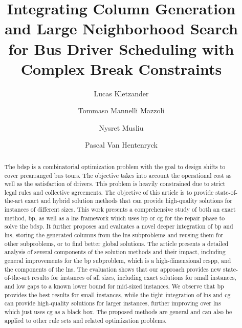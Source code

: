\documentclass[]{amsart}
\theoremstyle{plain}
\begin{document}
\title[Integrating CG and LNS for the BDSP]{Integrating Column Generation and Large Neighborhood Search for Bus Driver Scheduling with Complex Break Constraints}

\author[Kletzander]{Lucas Kletzander}
\author[Mannelli Mazzoli]{Tommaso Mannelli Mazzoli}
\author[Musliu]{Nysret Musliu}
\author[Van Hentenryck]{Pascal Van Hentenryck}

\begin{abstract}
    The \gls{bdsp} is a combinatorial optimization problem with the goal to design shifts to cover prearranged bus tours. The objective takes into account the operational cost as well as the satisfaction of drivers. This problem is heavily constrained due to strict legal rules and collective agreements.
    The objective of this article is to provide state-of-the-art exact and hybrid solution methods that can provide high-quality solutions for instances of different sizes.
    This work presents a comprehensive study of both an exact method, \gls{bp}, as well as a \gls{lns} framework which uses \gls{bp} or \gls{cg} for the repair phase to solve the \gls{bdsp}. It further proposes and evaluates a novel deeper integration of \gls{bp} and \gls{lns}, storing the generated columns from the \gls{lns} subproblems and reusing them for other subproblems, or to find better global solutions. 
    The article presents a detailed analysis of several components of the solution methods and their impact, including general improvements for the \gls{bp} subproblem, which is a high-dimensional \gls{rcspp}, and the components of the \gls{lns}. The evaluation shows that our approach provides new state-of-the-art results for instances of all sizes, including exact solutions for small instances, and low gaps to a known lower bound for mid-sized instances.
    We observe that \gls{bp} provides the best results for small instances, while the tight integration of \gls{lns} and \gls{cg} can provide high-quality solutions for larger instances, further improving over \gls{lns} which just uses \gls{cg} as a black box. The proposed methods are general and can also be applied to other rule sets and related optimization problems.
\end{abstract}

\maketitle
\end{document}
